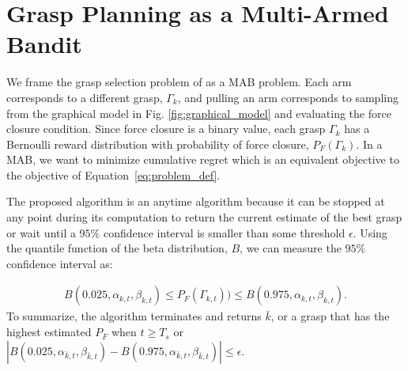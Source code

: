 \documentclass[10pt, conference]{ieeeconf}      %
\begin{document}
\section{Grasp Planning as a Multi-Armed Bandit}
We frame the grasp selection problem of  as a MAB problem.
Each arm corresponds to a different grasp, $\Gamma_k$, and pulling an arm corresponds to sampling from the graphical model in Fig. \ref{fig:graphical_model} and evaluating the force closure condition. Since force closure is a binary value, each grasp $\Gamma_k$ has a Bernoulli reward distribution with probability of force closure, $P_F(\Gamma_k)$.
In a MAB, we want to minimize cumulative regret which is an equivalent objective to the objective of Equation~\ref{eq:problem_def}.

The proposed algorithm is an anytime algorithm because it can be stopped at any point during its computation to return the current estimate of the best grasp or wait until a $95\%$ confidence interval is smaller than some threshold $\epsilon$. Using the quantile function of the beta distribution, $B$, we can measure the $95\%$ confidence interval as: 

\vspace{-2ex}
{\small
\begin{align}\label{eq:confidence}
B(0.025,\alpha_{k,t},\beta_{k,t}) \leq P_F(\Gamma_{k,t})) \leq B(0.975,\alpha_{k,t},\beta_{k,t}).
\end{align}
}
To summarize, the algorithm terminates and returns $\bar{k}$, or a grasp that has the highest estimated $P_F$ when 
$t \geq T_s $ or $|B(0.025,\alpha_{\bar{k},t},\beta_{\bar{k},t}) -
B(0.975,\alpha_{\bar{k},t},\beta_{\bar{k},t})| \leq \epsilon$.
\end{document}
